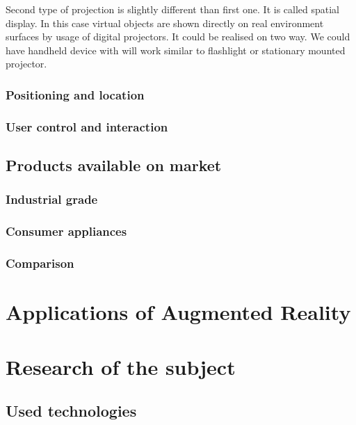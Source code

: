 \documentclass[printmode,en]{mgr}
\begin{document}
Second type of projection is slightly different than first one. It is called spatial display. In this case virtual objects are shown directly on real environment surfaces by usage of digital projectors. It could be realised on two way. We could have handheld device with will work similar to flashlight or stationary mounted projector.

\subsection{Positioning and location}
\subsection{User control and interaction}

\section{Products available on market}

\subsection{Industrial grade}

\subsection{Consumer appliances}

\subsection{Comparison}

\chapter{Applications of Augmented Reality}


\chapter{Research of the subject}

\section{Used technologies}
\end{document}
